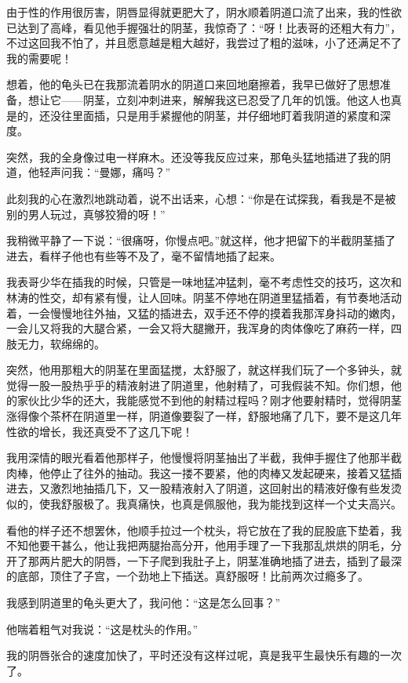 \documentclass[12pt,UTF8]{ctexbook}
\begin{document}
由于性的作用很厉害，阴唇显得就更肥大了，阴水顺着阴道口流了出来，我的性欲已达到了高峰，看见他手握强壮的阴茎，我惊奇了：“呀！比表哥的还粗大有力”，不过这回我不怕了，并且愿意越是粗大越好，我尝过了粗的滋味，小了还满足不了我的需要呢！

想着，他的龟头已在我那流着阴水的阴道口来回地磨擦着，我早已做好了思想准备，想让它——阴茎，立刻冲刺进来，解解我这已忍受了几年的饥饿。他这人也真是的，还没往里面插，只是用手紧握他的阴茎，并仔细地盯着我阴道的紧度和深度。

突然，我的全身像过电一样麻木。还没等我反应过来，那龟头猛地插进了我的阴道，他轻声问我：“曼娜，痛吗？”

此刻我的心在激烈地跳动着，说不出话来，心想：“你是在试探我，看我是不是被别的男人玩过，真够狡猾的呀！”

我稍微平静了一下说：“很痛呀，你慢点吧。”就这样，他才把留下的半截阴茎插了进去，看样子他也有些等不及了，毫不留情地插了起来。

我表哥少华在插我的时候，只管是一味地猛冲猛刺，毫不考虑性交的技巧，这次和林涛的性交，却有紧有慢，让人回味。阴茎不停地在阴道里猛插着，有节奏地活动着，一会慢慢地往外抽，又猛的插进去，双手还不停的摸着我那浑身抖动的嫩肉，一会儿又将我的大腿合紧，一会又将大腿撇开，我浑身的肉体像吃了麻药一样，四肢无力，软绵绵的。

突然，他用那粗大的阴茎在里面猛搅，太舒服了，就这样我们玩了一个多钟头，就觉得一股一股热乎乎的精液射进了阴道里，他射精了，可我假装不知。你们想，他的家伙比少华的还大，我能感觉不到他的射精过程吗？刚才他要射精时，觉得阴茎涨得像个茶杯在阴道里一样，阴道像要裂了一样，舒服地痛了几下，要不是这几年性欲的增长，我还真受不了这几下呢！

我用深情的眼光看着他那样子，他慢慢将阴茎抽出了半截，我伸手握住了他那半截肉棒，他停止了往外的抽动。我这一搂不要紧，他的肉棒又发起硬来，接着又猛插进去，又激烈地抽插几下，又一股精液射入了阴道，这回射出的精液好像有些发烫似的，使我舒服极了。我真痛快，也真是佩服他，我为能找到这样一个丈夫高兴。

看他的样子还不想罢休，他顺手拉过一个枕头，将它放在了我的屁股底下垫着，我不知他要干甚么，他让我把两腿抬高分开，他用手理了一下我那乱烘烘的阴毛，分开了那两片肥大的阴唇，一下子爬到我肚子上，阴茎准确地插了进去，插到了最深的底部，顶住了子宫，一个劲地上下插送。真舒服呀！比前两次过瘾多了。

我感到阴道里的龟头更大了，我问他：“这是怎么回事？”

他喘着粗气对我说：“这是枕头的作用。”

我的阴唇张合的速度加快了，平时还没有这样过呢，真是我平生最快乐有趣的一次了。
\end{document}
